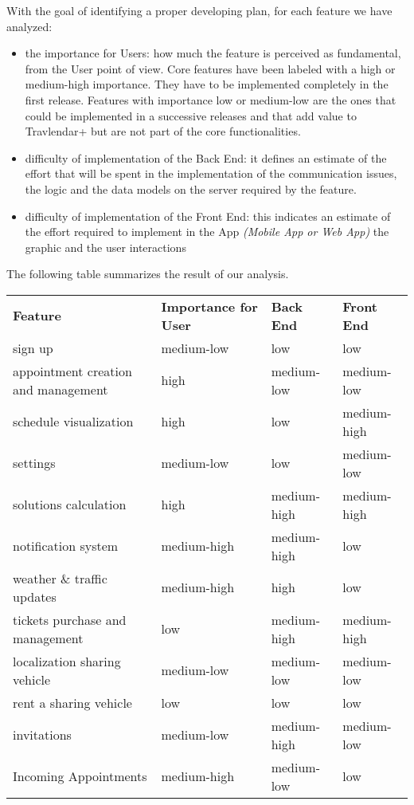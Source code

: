 With the goal of identifying a proper developing plan, for each feature we have analyzed:
\begin{itemize}
	\item the importance for Users: how much the feature is perceived as fundamental, from the User point of view. Core features have been labeled with a high or medium-high importance. They have to be implemented completely in the first release. Features with importance low or medium-low are the ones that could be implemented in a successive releases and that add value to Travlendar+ but are not part of the core functionalities.
	\item difficulty of implementation of the Back End: it defines an estimate of the effort that will be spent in the implementation of the communication issues, the logic and the data models on the server required by the feature.
	\item difficulty of implementation of the Front End: this indicates an estimate of the effort required to implement in the App \textit{(Mobile App or Web App)} the graphic and the user interactions
\end{itemize}

\noindent
The following table summarizes the result of our analysis.

\begin{center}
	\renewcommand{\arraystretch}{1.5}
	\begin{tabular}{|p{} l l l|}
		\hline
		\rowcolor{gray!45}
		\textbf{Feature} & \textbf{Importance for User} & \textbf{Back End} & \textbf{Front End}\\

		sign up 					& medium-low 	& low 			& low \\
		appointment creation and management	& high 	& medium-low	& medium-low \\
		schedule visualization		& high 			& low			& medium-high \\
		settings 					& medium-low 	& low			& medium-low \\
		solutions calculation 		& high 			& medium-high	& medium-high \\
		notification system 		& medium-high 	& medium-high	& low \\
		weather \& traffic updates 	& medium-high 	& high			& low \\
		tickets purchase and management	& low 		& medium-high	& medium-high \\
		localization sharing vehicle& medium-low 	& medium-low	& medium-low \\
		rent a sharing vehicle		& low 			& low			& low \\
		invitations					& medium-low	& medium-high	& medium-low \\
		Incoming Appointments		& medium-high	& medium-low	& low \\
		\hline
	\end{tabular}
\end{center}

